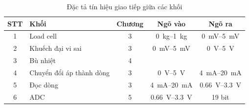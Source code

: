 \begin{table}[H]
    \centering
    \caption{Đặc tả tín hiệu giao tiếp giữa các khối}
    \label{tab:c2:giao-tiep-khoi}
    \renewcommand{\arraystretch}{1.3}
    \begin{tabularx}{\textwidth}{|c|X|c|c|c|}
        \hline
        \textbf{STT} & \textbf{Khối} & \textbf{Chương} & \textbf{Ngõ vào} & \textbf{Ngõ ra} \\ \hline
        1 & Load cell                     & 3 & \qtyrange{0}{1}{\kilo\gram}      & \qtyrange{0}{5}{\milli\volt} \\ \hline
        2 & Khuếch đại vi sai             & 3 & \qtyrange{0}{5}{\milli\volt}     & \qtyrange{0}{5}{\volt} \\ \hline
        3 & Bù nhiệt                      & 4 & \TODO{}                          & \TODO{} \\ \hline
        4 & Chuyển đổi áp thành dòng      & 3 & \qtyrange{0}{5}{\volt}           & \qtyrange{4}{20}{\milli\ampere} \\ \hline
        5 & Đọc dòng                      & 3 & \qtyrange{4}{20}{\milli\ampere}  & \qtyrange{0.66}{3.3}{\volt} \\ \hline
        6 & ADC                           & 5 & \qtyrange{0.66}{3.3}{\volt}      & 19 bit \\ \hline
    \end{tabularx}
\end{table}
 

